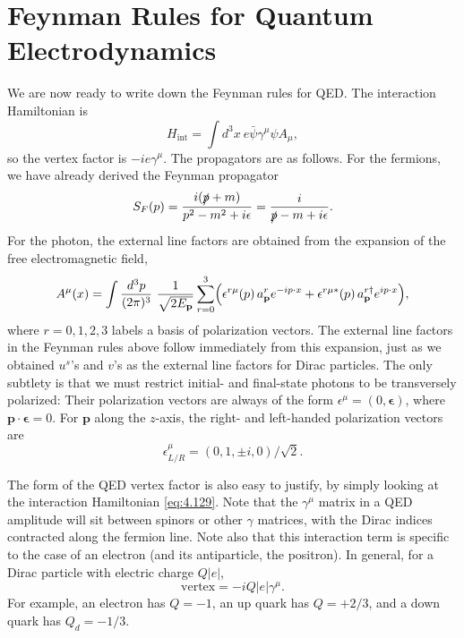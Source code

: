 \section{Feynman Rules for Quantum Electrodynamics}

We are now ready to write down the Feynman rules for QED.  The interaction
Hamiltonian is
\begin{equation}
  H_{\mathrm{int}} = \int d^3x\ e\bar{\psi}\gamma^\mu\psi A_\mu ,
  \label{eq:4.129}
\end{equation}
so the vertex factor is $-ie\gamma^\mu$.  The propagators are as follows.  For
the fermions, we have already derived the Feynman propagator
\begin{equation}
  S_F(p) = \frac{i(\slashed{p}+m)}{p^2-m^2+i\epsilon}
    = \frac{i}{\slashed{p}-m+i\epsilon} .
  \label{eq:4.130}
\end{equation}
For the photon, the external line factors are obtained from the expansion of
the free electromagnetic field,
\begin{equation}
  A^\mu(x) = \int \frac{d^3p}{(2\pi)^3}\ \frac{1}{\sqrt{2E_{\mathbf{p}}}}
    \sum_{r=0}^{3} \Bigl( \epsilon^{r\mu}(p)\,a_{\mathbf{p}}^r e^{-ip\cdot x}
      + \epsilon^{r\mu*}(p)\,a_{\mathbf{p}}^{r\dagger}e^{ip\cdot x} \Bigr),
  \label{eq:4.131}
\end{equation}
where $r = 0, 1, 2, 3$ labels a basis of polarization vectors.  The external
line factors in the Feynman rules above follow immediately from this
expansion, just as we obtained $u^s$'s and $v$'s as the external line factors
for Dirac particles.  The only subtlety is that we must restrict initial- and
final-state photons to be transversely polarized: Their polarization vectors
are always of the form $\epsilon^\mu = (0, \bm{\epsilon})$, where
$\mathbf{p}\cdot\bm{\epsilon} = 0$.  For $\mathbf{p}$ along the $z$-axis, the
right- and left-handed polarization vectors are
\begin{equation}
  \epsilon^{\mu}_{L/R} = (0, 1, \pm i, 0)/\sqrt{2} .
  \label{eq:4.132}
\end{equation}

The form of the QED vertex factor is also easy to justify, by simply looking
at the interaction Hamiltonian \eqref{eq:4.129}.  Note that the $\gamma^\mu$
matrix in a QED amplitude will sit between spinors or other $\gamma$ matrices,
with the Dirac indices contracted along the fermion line.  Note also that this
interaction term is specific to the case of an electron (and its antiparticle,
the positron).  In general, for a Dirac particle with electric charge
$Q|e|$,
\begin{equation}
  \text{vertex} = -iQ|e|\gamma^\mu .
  \label{eq:4.133}
\end{equation}
For example, an electron has $Q = -1$, an up quark has $Q = +2/3$, and a
down quark has $Q_d = -1/3$.


